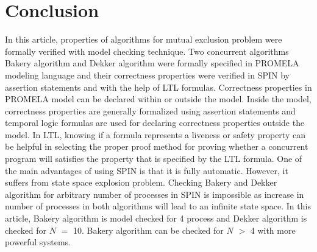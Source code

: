 \documentclass[conference]{IEEEtran}
\begin{document}
\section{Conclusion}
In this article, properties of algorithms for mutual exclusion problem were formally verified with model checking technique. 
Two concurrent algorithms Bakery algorithm and Dekker algorithm were formally specified in PROMELA modeling language and their
correctness properties were verified in SPIN by assertion statements and with the help of LTL formulas. Correctness properties
in PROMELA model can be declared within or outside the model. Inside the model, correctness properties are generally formalized using 
assertion statements and temporal logic formulas are used for declaring correctness properties outside the model. 
In LTL, knowing if a formula represents a liveness or safety property can be helpful in selecting the proper proof method for proving
whether a concurrent program will satisfies the property that is specified by the LTL formula. One of the main advantages of using SPIN 
is that it is fully automatic. However, it suffers from state space explosion problem. Checking Bakery and Dekker algorithm for arbitrary 
number of processes in SPIN is impossible as increase in number of processes in both algorithms will lead to an infinite state space.
In this article, Bakery algorithm is model checked for 4 process and Dekker algorithm is checked for $N$ $=$ 10. Bakery algorithm can be checked 
for $N$ $>$ 4 with more powerful systems. 
\end{document}
